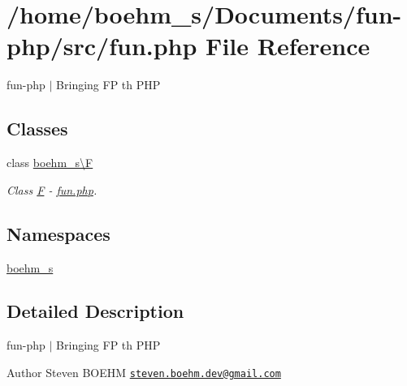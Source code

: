 \hypertarget{fun_8php}{}\section{/home/boehm\+\_\+s/\+Documents/fun-\/php/src/fun.php File Reference}
\label{fun_8php}


fun-\/php $\vert$ Bringing FP th P\+HP  


\subsection*{Classes}
\begin{DoxyCompactItemize}
\item 
class \hyperlink{classboehm__s_1_1F}{boehm\+\_\+s\textbackslash{}F}
\begin{DoxyCompactList}\small\item\em Class \hyperlink{classboehm__s_1_1F}{F} -\/ \hyperlink{fun_8php}{fun.\+php}. \end{DoxyCompactList}\end{DoxyCompactItemize}
\subsection*{Namespaces}
\begin{DoxyCompactItemize}
\item 
 \hyperlink{namespaceboehm__s}{boehm\+\_\+s}
\end{DoxyCompactItemize}


\subsection{Detailed Description}
fun-\/php $\vert$ Bringing FP th P\+HP 

\begin{DoxyAuthor}{Author}
Steven B\+O\+E\+HM \href{mailto:steven.boehm.dev@gmail.com}{\tt steven.\+boehm.\+dev@gmail.\+com} 
\end{DoxyAuthor}
